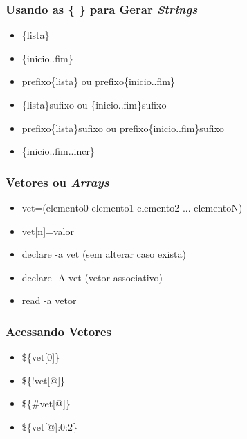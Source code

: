 \documentclass{beamer}
\begin{document}
   \begin{frame}
      \frametitle{Usando as \{ \} para Gerar \textit{Strings}}
      \begin{itemize}
         \item \{lista\}
	      \item \{inicio..fim\}
	      \item prefixo\{lista\} ou prefixo\{inicio..fim\}
	      \item \{lista\}sufixo ou \{inicio..fim\}sufixo
	      \item prefixo\{lista\}sufixo ou prefixo\{inicio..fim\}sufixo
	      \item \{inicio..fim..incr\}
      \end{itemize}
   \end{frame}

   \begin{frame}
      \frametitle{Vetores ou \textit{Arrays}}
      \begin{itemize}
         \item vet=(elemento0 elemento1 elemento2 ... elementoN)
	      \item vet[n]=valor
	      \item declare -a vet (sem alterar caso exista)
	      \item declare -A vet (vetor associativo)
	      \item read -a vetor
      \end{itemize}
   \end{frame}

   \begin{frame}
      \frametitle{Acessando Vetores}
      \begin{itemize}
         \item \$\{vet[0]\}
         \item \$\{!vet[@]\}
	 \item \$\{\#vet[@]\}
	 \item \$\{vet[@]:0:2\}
      \end{itemize}
   \end{frame}
   
\end{document}
